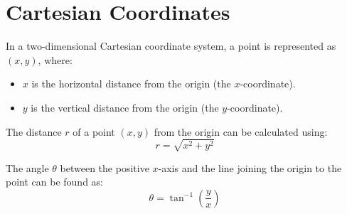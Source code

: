\documentclass{article}
\begin{document}
\section*{Cartesian Coordinates}

In a two-dimensional Cartesian coordinate system, a point is represented as \((x, y)\), where:
\begin{itemize}
    \item \(x\) is the horizontal distance from the origin (the \(x\)-coordinate).
    \item \(y\) is the vertical distance from the origin (the \(y\)-coordinate).
\end{itemize}

The distance \(r\) of a point \((x, y)\) from the origin can be calculated using:
\[
r = \sqrt{x^2 + y^2}
\]

The angle \(\theta\) between the positive \(x\)-axis and the line joining the origin to the point can be found as:
\[
\theta = \tan^{-1}\left(\frac{y}{x}\right)
\]
\end{document}

